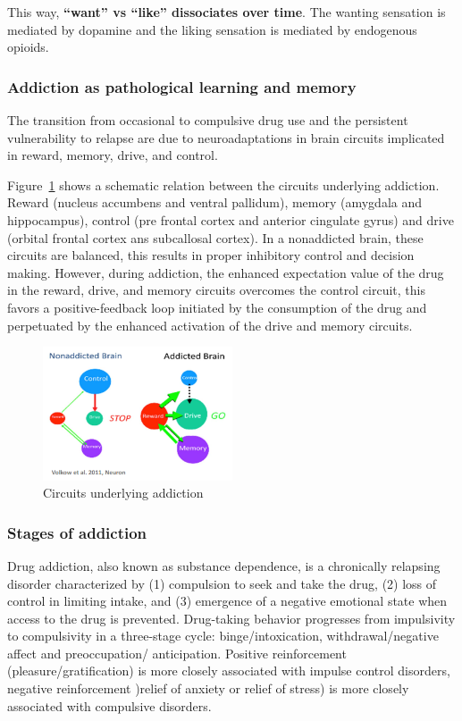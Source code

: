 \documentclass[12pt,article,oneside,a4paper]{memoir}
\begin{document}
This way, \textbf{``want'' vs ``like'' dissociates over time}. The wanting
sensation is mediated by dopamine and the liking sensation is mediated by
endogenous opioids.


\subsubsection{Addiction as pathological learning and memory}
The transition from occasional to compulsive drug use and the persistent
vulnerability to relapse are due to neuroadaptations in brain circuits
implicated in reward, memory, drive, and control.

Figure~\ref{fig:circuits-drug-addiction} shows a schematic relation between the
circuits underlying addiction. Reward (nucleus accumbens and ventral pallidum),
memory (amygdala and hippocampus), control (pre frontal cortex and anterior
cingulate gyrus) and drive (orbital frontal cortex ans subcallosal cortex). In
a nonaddicted brain, these circuits are balanced, this results in proper
inhibitory control and decision making. However, during addiction, the enhanced
expectation value of the drug in the reward, drive, and memory circuits
overcomes the control circuit, this favors a positive-feedback loop initiated by
the consumption of the drug and perpetuated by the enhanced activation of the
drive and memory circuits. 

\begin{figure}
  \centering
  \includegraphics[width=0.5\textwidth]{imgs/circuits-drug-addiction.png}
  \caption{Circuits underlying addiction}
  \label{fig:circuits-drug-addiction}
\end{figure}

\subsubsection{Stages of addiction}
Drug addiction, also known as substance dependence, is a chronically relapsing
disorder characterized by (1) compulsion to seek and take the drug, (2) loss of
control in limiting intake, and (3) emergence of a negative emotional state when
access to the drug is prevented.
Drug-taking behavior progresses from impulsivity to compulsivity in a three-stage
cycle: binge/intoxication, withdrawal/negative affect and preoccupation/
anticipation. Positive reinforcement (pleasure/gratification) is more closely
associated with impulse control disorders, negative reinforcement )relief of
anxiety or relief of stress) is more closely associated with compulsive disorders.
\end{document}
